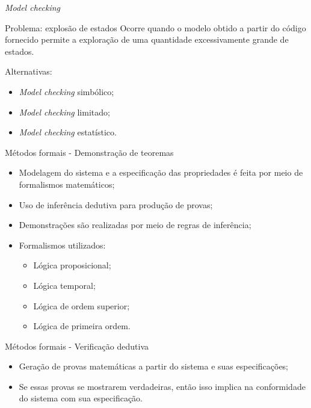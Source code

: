 \begin{frame}{\textit{Model checking}}
    \begin{alertblock}{Problema: explosão de estados}
    Ocorre quando o modelo obtido a partir do código fornecido permite a exploração de uma quantidade excessivamente grande de estados.
    \end{alertblock}
    Alternativas:
    \begin{itemize}
        \item \textit{Model checking} simbólico;
        \item \textit{Model checking} limitado;
        \item \textit{Model checking} estatístico.
    \end{itemize}
\end{frame}

\begin{frame}{Métodos formais - Demonstração de teoremas}
    \begin{itemize}
        \item Modelagem do sistema e a especificação das propriedades é feita por meio de formalismos matemáticos;
        \item Uso de inferência dedutiva para produção de provas;
        \item Demonstrações são realizadas por meio de regras de inferência;
        \item Formalismos utilizados:
        \begin{itemize}
            \item Lógica proposicional;
            \item Lógica temporal;
            \item Lógica de ordem superior;
            \item Lógica de primeira ordem.
        \end{itemize}
    \end{itemize}
\end{frame}

\begin{frame}{Métodos formais - Verificação dedutiva}
\begin{itemize}
    \item Geração de provas matemáticas a partir do sistema e suas especificações;
    \item Se essas provas se mostrarem verdadeiras, então isso implica na conformidade do sistema com sua especificação.
\end{itemize}

\end{frame}

